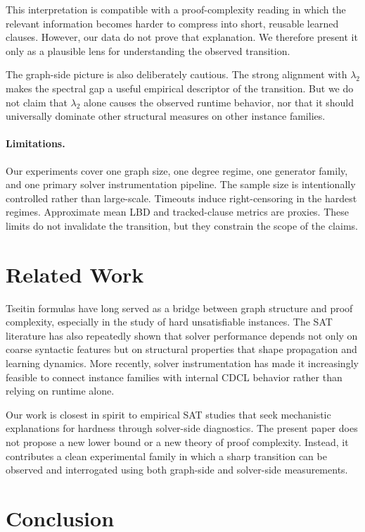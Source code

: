 \documentclass[11pt]{article}
\begin{document}
This interpretation is compatible with a proof-complexity reading in which the relevant information becomes harder to compress into short, reusable learned clauses. 
However, our data do not prove that explanation. We therefore present it only as a plausible lens for understanding the observed transition.

The graph-side picture is also deliberately cautious. The strong alignment with $\lambda_2$ makes the spectral gap a useful empirical descriptor of the transition. 
But we do not claim that $\lambda_2$ alone causes the observed runtime behavior, nor that it should universally dominate other structural measures on other instance families.

\paragraph{Limitations.}
Our experiments cover one graph size, one degree regime, one generator family, and one primary solver instrumentation pipeline. The sample size is intentionally controlled rather than large-scale. Timeouts induce right-censoring in the hardest regimes. Approximate mean LBD and tracked-clause metrics are proxies. These limits do not invalidate the transition, but they constrain the scope of the claims.

\section{Related Work}

Tseitin formulas have long served as a bridge between graph structure and proof complexity, especially in the study of hard unsatisfiable instances. The SAT literature has also repeatedly shown that solver performance depends not only on coarse syntactic features but on structural properties that shape propagation and learning dynamics. More recently, solver instrumentation has made it increasingly feasible to connect instance families with internal CDCL behavior rather than relying on runtime alone.

Our work is closest in spirit to empirical SAT studies that seek mechanistic explanations for hardness through solver-side diagnostics. The present paper does not propose a new lower bound or a new theory of proof complexity. Instead, it contributes a clean experimental family in which a sharp transition can be observed and interrogated using both graph-side and solver-side measurements.

\section{Conclusion}
\end{document}
